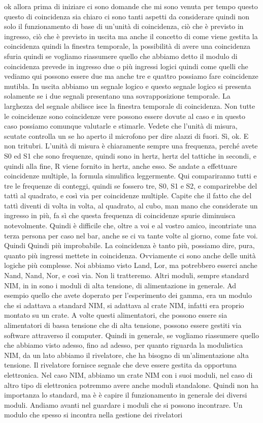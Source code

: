 ok allora prima di iniziare ci sono domande che mi sono venuta per tempo questo questo di coincidenza sia chiaro ci sono tanti aspetti da considerare quindi non solo il funzionamento di base di un'unità di coincidenza, ciò che è previsto in ingresso, ciò che è previsto in uscita ma anche il concetto di come viene gestita la coincidenza quindi la finestra temporale, la possibilità di avere una coincidenza sfuria quindi se vogliamo riassumere quello che abbiamo detto il modulo di coincidenza prevede in ingresso due o più ingressi logici quindi come quelli che vediamo qui possono essere due ma anche tre e quattro possiamo fare coincidenze mutibla. In uscita abbiamo un segnale logico e questo segnale logico si presenta solamente se i due segnali presentano una sovrapposizione temporale. La larghezza del segnale abilisce isce la finestra temporale di coincidenza. Non tutte le coincidenze sono coincidenze vere possono essere dovute al caso e in questo caso possiamo comunque valutarle e stimarle. Vedete che l'unità di misura, scutate controlla un se ho aperto il microfono per dire alazzi di fuori. Sì, ok. E non tritubri. L'unità di misura è chiaramente sempre una frequenza, perché avete S0 ed S1 che sono frequenze, quindi sono in hertz, hertz del tattiche in secondi, e quindi alla fine, R viene fornito in hertz, anche esso. Se andate a effettuare coincidenze multiple, la formula simulifica leggermente. Qui compariranno tutti e tre le frequenze di conteggi, quindi se fossero tre, S0, S1 e S2, e comparirebbe del tattì al quadrato, e così via per coincidenze multiple. Capite che il fatto che del tattì diventi di volta in volta, al quadrato, al cubo, man mano che considerate un ingresso in più, fa sì che questa frequenza di coincidenze spurie diminuisca notevolmente. Quindi è difficile che, oltre a voi e al vostro amico, incontriate una terza persona per caso nel bar, anche se ci va tante volte al giorno, come fate voi. Quindi Quindi più improbabile. La coincidenza è tanto più, possiamo dire, pura, quanto più ingressi mettete in coincidenza. Ovviamente ci sono anche delle unità logiche più complesse. Noi abbiamo visto Land, Lor, ma potrebbero esserci anche Nand, Nand, Nor, e così via. Non li tratteremo. Altri moduli, sempre standard NIM, in in sono i moduli di alta tensione, di alimentazione in generale. Ad esempio quello che avete doperato per l'esperimento dei gamma, era un modulo che si adattava a standard NIM, si adattava al crate NIM, infatti era proprio montato su un crate. A volte questi alimentatori, che possono essere sia alimentatori di bassa tensione che di alta tensione, possono essere gestiti via software attraverso il computer. Quindi in generale, se vogliamo riassumere quello che abbiamo visto adesso, fino ad adesso, per quanto riguarda la modulistica NIM, da un lato abbiamo il rivelatore, che ha bisogno di un'alimentazione alta tensione. Il rivelatore fornisce segnale che deve essere gestita da opportuna elettronica. Nel caso NIM, abbiamo un crate NIM con i suoi moduli, nel caso di altro tipo di elettronica potremmo avere anche moduli standalone. Quindi non ha importanza lo standard, ma è è capire il funzionamento in generale dei diversi moduli. Andiamo avanti nel guardare i moduli che si possono incontrare. Un modulo che spesso si incontra nella gestione dei rivelatori 